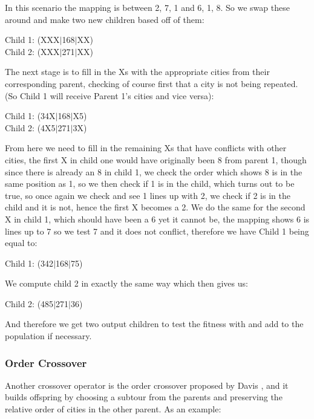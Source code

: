 \documentclass[11pt,a4paper,titlepage]{article}
\begin{document}
In this scenario the mapping is between 2, 7, 1 and 6, 1, 8. So we swap these around and make two new children based off of them:

\begin{center}\Large
Child 1: (XXX$|$168$|$XX)\\
Child 2: (XXX$|$271$|$XX)
\end{center}

The next stage is to fill in the Xs with the appropriate cities from their corresponding parent, checking of course first that a city is not being repeated. (So Child 1 will receive Parent 1's cities and vice versa):

\begin{center}\Large
Child 1: (34X$|$168$|$X5)\\
Child 2: (4X5$|$271$|$3X)
\end{center}

From here we need to fill in the remaining Xs that have conflicts with other cities, the first X in child one would have originally been 8 from parent 1, though since there is already an 8 in child 1, we check the order which shows 8 is in the same position as 1, so we then check if 1 is in the child, which turns out to be true, so once again we check and see 1 lines up with 2, we check if 2 is in the child and it is not, hence the first X becomes a 2. We do the same for the second X in child 1, which should have been a 6 yet it cannot be, the mapping shows 6 is lines up to 7 so we test 7 and it does not conflict, therefore we have Child 1 being equal to:

\begin{center}\Large
Child 1: (342$|$168$|$75)
\end{center}

We compute child 2 in exactly the same way which then gives us:

\begin{center}\Large
Child 2: (485$|$271$|$36)
\end{center}

And therefore we get two output children to test the fitness with and add to the population if necessary.

\subsubsection{Order Crossover}

Another crossover operator is the order crossover proposed by Davis \cite{GACrossover}, and it builds offspring by choosing a subtour from the parents and preserving the relative order of cities in the other parent. As an example:
\end{document}
